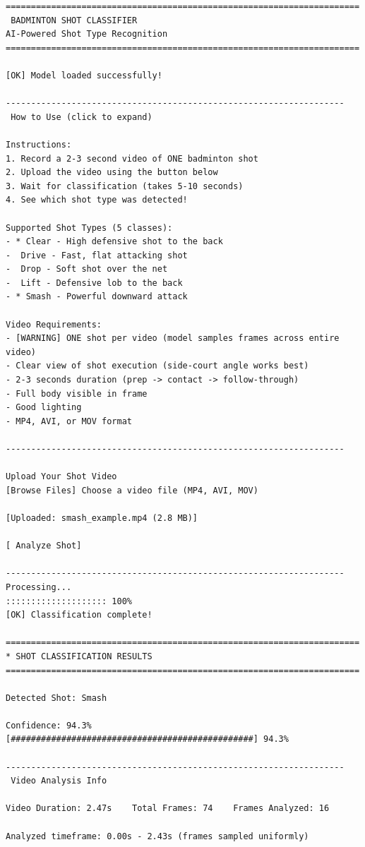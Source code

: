 \documentclass[11pt,a4paper]{article}
\begin{document}
\begin{verbatim}
======================================================================
 BADMINTON SHOT CLASSIFIER
AI-Powered Shot Type Recognition
======================================================================

[OK] Model loaded successfully!

-------------------------------------------------------------------
 How to Use (click to expand)

Instructions:
1. Record a 2-3 second video of ONE badminton shot
2. Upload the video using the button below
3. Wait for classification (takes 5-10 seconds)
4. See which shot type was detected!

Supported Shot Types (5 classes):
- * Clear - High defensive shot to the back
-  Drive - Fast, flat attacking shot
-  Drop - Soft shot over the net
-  Lift - Defensive lob to the back
- * Smash - Powerful downward attack

Video Requirements:
- [WARNING] ONE shot per video (model samples frames across entire video)
- Clear view of shot execution (side-court angle works best)
- 2-3 seconds duration (prep -> contact -> follow-through)
- Full body visible in frame
- Good lighting
- MP4, AVI, or MOV format

-------------------------------------------------------------------

Upload Your Shot Video
[Browse Files] Choose a video file (MP4, AVI, MOV)

[Uploaded: smash_example.mp4 (2.8 MB)]

[ Analyze Shot]

-------------------------------------------------------------------
Processing...
:::::::::::::::::::: 100%
[OK] Classification complete!

======================================================================
* SHOT CLASSIFICATION RESULTS
======================================================================

Detected Shot: Smash

Confidence: 94.3%
[################################################] 94.3%

-------------------------------------------------------------------
 Video Analysis Info

Video Duration: 2.47s    Total Frames: 74    Frames Analyzed: 16

Analyzed timeframe: 0.00s - 2.43s (frames sampled uniformly)


\end{verbatim}
\end{document}
